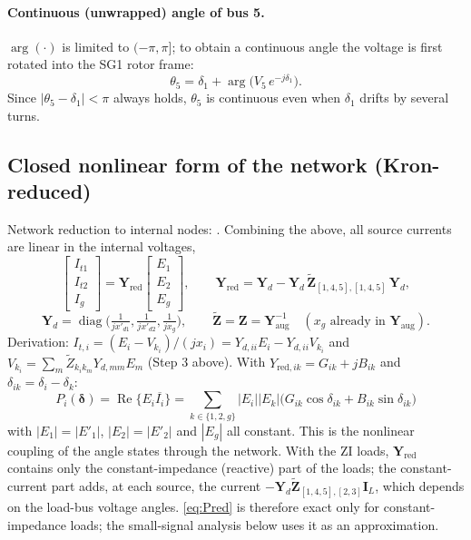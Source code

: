 \documentclass[11pt,a4paper]{article}
\numberwithin{equation}{section}
\newcommand{\cj}[1]{\overline{#1}}
\newcommand{\re}{\operatorname{Re}}
\begin{document}
\paragraph{Continuous (unwrapped) angle of bus 5.}
$\arg(\cdot)$ is limited to $(-\pi,\pi]$; to obtain a continuous angle the voltage is first rotated into the SG1 rotor frame:
\begin{equation}
\boxed{\theta_5 = \delta_1 + \arg\!\big(V_5\,e^{-j\delta_1}\big).}
\end{equation}
Since $|\theta_5-\delta_1|<\pi$ always holds, $\theta_5$ is continuous even when $\delta_1$ drifts by several turns.

\subsection{Closed nonlinear form of the network (Kron-reduced)}
Network reduction to internal nodes: \cite{BergenVittal2000,SauerPai1998}.
Combining the above, all source currents are linear in the internal voltages,
\begin{equation}
\begin{bmatrix} I_{t1}\\ I_{t2}\\ I_g\end{bmatrix}
= \bm Y_{\text{red}}\begin{bmatrix} E_1\\ E_2\\ E_g\end{bmatrix},\qquad
\bm Y_{\text{red}} = \bm Y_d - \bm Y_d\,\tilde{\bm Z}_{[1,4,5],[1,4,5]}\,\bm Y_d,
\end{equation}
\begin{equation}
\bm Y_d = \operatorname{diag}\!\Big(\tfrac{1}{jx'_{d1}},\tfrac{1}{jx'_{d2}},\tfrac{1}{jx_g}\Big),\qquad
\tilde{\bm Z} = \bm Z = \bm Y_{\text{aug}}^{-1}\quad(x_g\text{ already in }\bm Y_{\text{aug}}).
\end{equation}
Derivation: $I_{t,i} = (E_i - V_{k_i})/(jx_i) = Y_{d,ii}E_i - Y_{d,ii}V_{k_i}$ and $V_{k_i} = \sum_m \tilde Z_{k_i k_m} Y_{d,mm}E_m$ (Step 3 above).
With $Y_{\text{red},ik} = G_{ik}+jB_{ik}$ and $\delta_{ik}=\delta_i-\delta_k$:
\begin{equation}
\boxed{P_{i}(\bm\delta) = \re\{E_i\cj{I_i}\} = \sum_{k\in\{1,2,g\}} |E_i||E_k|\big(G_{ik}\cos\delta_{ik} + B_{ik}\sin\delta_{ik}\big)}
\label{eq:Pred}
\end{equation}
with $|E_1| = |E'_1|$, $|E_2| = |E'_2|$ and $|E_g|$ all constant. This is the nonlinear coupling of the angle states through the network. With the ZI loads, $\bm Y_{\text{red}}$ contains only the constant-impedance (reactive) part of the loads; the constant-current part adds, at each source, the current $-\bm Y_d\tilde{\bm Z}_{[1,4,5],[2,3]}\bm I_L$, which depends on the load-bus voltage angles. \eqref{eq:Pred} is therefore exact only for constant-impedance loads; the small-signal analysis below uses it as an approximation.
\end{document}
